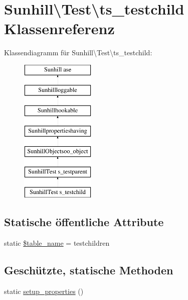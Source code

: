 \hypertarget{classSunhill_1_1Test_1_1ts__testchild}{}\section{Sunhill\textbackslash{}Test\textbackslash{}ts\+\_\+testchild Klassenreferenz}
\label{classSunhill_1_1Test_1_1ts__testchild}
Klassendiagramm für Sunhill\textbackslash{}Test\textbackslash{}ts\+\_\+testchild\+:\begin{figure}[H]
\begin{center}
\leavevmode
\includegraphics[height=7.000000cm]{db/dd2/classSunhill_1_1Test_1_1ts__testchild}
\end{center}
\end{figure}
\subsection*{Statische öffentliche Attribute}
\begin{DoxyCompactItemize}
\item 
static \hyperlink{classSunhill_1_1Test_1_1ts__testchild_abe1fcdb23b255dca6b46a80885bb9bf3}{\$table\+\_\+name} = \textquotesingle{}testchildren\textquotesingle{}
\end{DoxyCompactItemize}
\subsection*{Geschützte, statische Methoden}
\begin{DoxyCompactItemize}
\item 
static \hyperlink{classSunhill_1_1Test_1_1ts__testchild_a76a3acd2579b7e8b77968327d5b99be1}{setup\+\_\+properties} ()
\end{DoxyCompactItemize}
